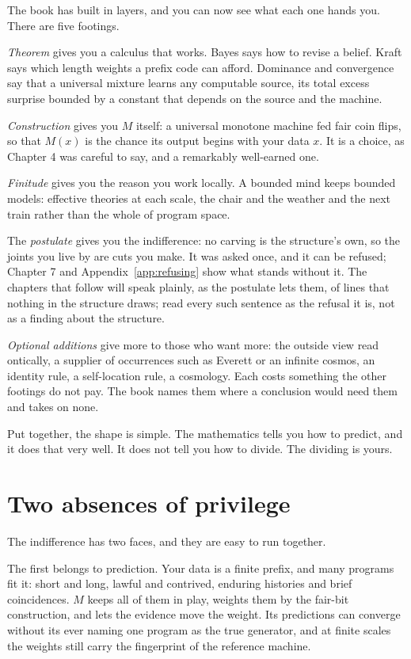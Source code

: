 The book has built in layers, and you can now see what each one hands you. There are five footings.

\emph{Theorem} gives you a calculus that works. Bayes says how to revise a belief. Kraft says which length weights a prefix code can afford. Dominance and convergence say that a universal mixture learns any computable source, its total excess surprise bounded by a constant that depends on the source and the machine.

\emph{Construction} gives you $M$ itself: a universal monotone machine fed fair coin flips, so that $M(x)$ is the chance its output begins with your data $x$. It is a choice, as Chapter 4 was careful to say, and a remarkably well-earned one.

\emph{Finitude} gives you the reason you work locally. A bounded mind keeps bounded models: effective theories at each scale, the chair and the weather and the next train rather than the whole of program space.

The \emph{postulate} gives you the indifference: no carving is the structure's own, so the joints you live by are cuts you make. It was asked once, and it can be refused; Chapter 7 and Appendix~\ref{app:refusing} show what stands without it. The chapters that follow will speak plainly, as the postulate lets them, of lines that nothing in the structure draws; read every such sentence as the refusal it is, not as a finding about the structure.

\emph{Optional additions} give more to those who want more: the outside view read ontically, a supplier of occurrences such as Everett or an infinite cosmos, an identity rule, a self-location rule, a cosmology. Each costs something the other footings do not pay. The book names them where a conclusion would need them and takes on none.

Put together, the shape is simple. The mathematics tells you how to predict, and it does that very well. It does not tell you how to divide. The dividing is yours.

\section*{Two absences of privilege}

The indifference has two faces, and they are easy to run together.

The first belongs to prediction. Your data is a finite prefix, and many programs fit it: short and long, lawful and contrived, enduring histories and brief coincidences. $M$ keeps all of them in play, weights them by the fair-bit construction, and lets the evidence move the weight. Its predictions can converge without its ever naming one program as the true generator, and at finite scales the weights still carry the fingerprint of the reference machine.

